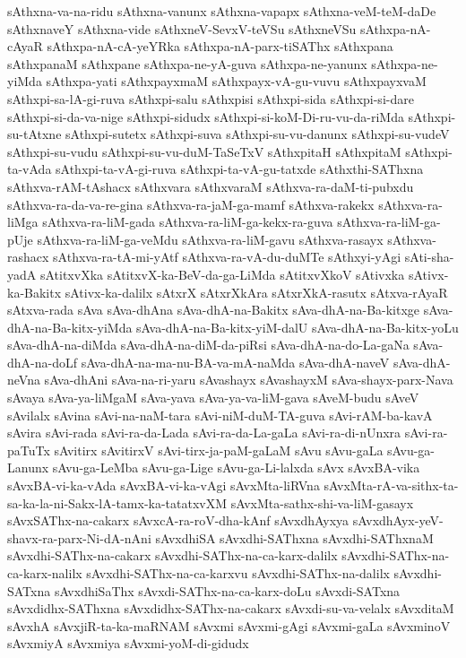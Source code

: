 {sAthxna-va-na-ridu
sAthxna-vanunx
sAthxna-vapapx
sAthxna-veM-teM-daDe
sAthxnaveY
sAthxna-vide
sAthxneV-SevxV-teVSu
sAthxneVSu
sAthxpa-nA-cAyaR
sAthxpa-nA-cA-yeYRka
sAthxpa-nA-parx-tiSAThx
sAthxpana
sAthxpanaM
sAthxpane
sAthxpa-ne-yA-guva
sAthxpa-ne-yanunx
sAthxpa-ne-yiMda
sAthxpa-yati
sAthxpayxmaM
sAthxpayx-vA-gu-vuvu
sAthxpayxvaM
sAthxpi-sa-lA-gi-ruva
sAthxpi-salu
sAthxpisi
sAthxpi-sida
sAthxpi-si-dare
sAthxpi-si-da-va-nige
sAthxpi-sidudx
sAthxpi-si-koM-Di-ru-vu-da-riMda
sAthxpi-su-tAtxne
sAthxpi-sutetx
sAthxpi-suva
sAthxpi-su-vu-danunx
sAthxpi-su-vudeV
sAthxpi-su-vudu
sAthxpi-su-vu-duM-TaSeTxV
sAthxpitaH
sAthxpitaM
sAthxpi-ta-vAda
sAthxpi-ta-vA-gi-ruva
sAthxpi-ta-vA-gu-tatxde
sAthxthi-SAThxna
sAthxva-rAM-tAshacx
sAthxvara
sAthxvaraM
sAthxva-ra-daM-ti-pubxdu
sAthxva-ra-da-va-re-gina
sAthxva-ra-jaM-ga-mamf
sAthxva-rakekx
sAthxva-ra-liMga
sAthxva-ra-liM-gada
sAthxva-ra-liM-ga-kekx-ra-guva
sAthxva-ra-liM-ga-pUje
sAthxva-ra-liM-ga-veMdu
sAthxva-ra-liM-gavu
sAthxva-rasayx
sAthxva-rashacx
sAthxva-ra-tA-mi-yAtf
sAthxva-ra-vA-du-duMTe
sAthxyi-yAgi
sAti-sha-yadA
sAtitxvXka
sAtitxvX-ka-BeV-da-ga-LiMda
sAtitxvXkoV
sAtivxka
sAtivx-ka-Bakitx
sAtivx-ka-dalilx
sAtxrX
sAtxrXkAra
sAtxrXkA-rasutx
sAtxva-rAyaR
sAtxva-rada
sAva
sAva-dhAna
sAva-dhA-na-Bakitx
sAva-dhA-na-Ba-kitxge
sAva-dhA-na-Ba-kitx-yiMda
sAva-dhA-na-Ba-kitx-yiM-dalU
sAva-dhA-na-Ba-kitx-yoLu
sAva-dhA-na-diMda
sAva-dhA-na-diM-da-piRsi
sAva-dhA-na-do-La-gaNa
sAva-dhA-na-doLf
sAva-dhA-na-ma-nu-BA-va-mA-naMda
sAva-dhA-naveV
sAva-dhA-neVna
sAva-dhAni
sAva-na-ri-yaru
sAvashayx
sAvashayxM
sAva-shayx-parx-Nava
sAvaya
sAva-ya-liMgaM
sAva-yava
sAva-ya-va-liM-gava
sAveM-budu
sAveV
sAvilalx
sAvina
sAvi-na-naM-tara
sAvi-niM-duM-TA-guva
sAvi-rAM-ba-kavA
sAvira
sAvi-rada
sAvi-ra-da-Lada
sAvi-ra-da-La-gaLa
sAvi-ra-di-nUnxra
sAvi-ra-paTuTx
sAvitirx
sAvitirxV
sAvi-tirx-ja-paM-gaLaM
sAvu
sAvu-gaLa
sAvu-ga-Lanunx
sAvu-ga-LeMba
sAvu-ga-Lige
sAvu-ga-Li-lalxda
sAvx
sAvxBA-vika
sAvxBA-vi-ka-vAda
sAvxBA-vi-ka-vAgi
sAvxMta-liRVna
sAvxMta-rA-va-sithx-ta-sa-ka-la-ni-Sakx-lA-tamx-ka-tatatxvXM
sAvxMta-sathx-shi-va-liM-gasayx
sAvxSAThx-na-cakarx
sAvxcA-ra-roV-dha-kAnf
sAvxdhAyxya
sAvxdhAyx-yeV-shavx-ra-parx-Ni-dA-nAni
sAvxdhiSA
sAvxdhi-SAThxna
sAvxdhi-SAThxnaM
sAvxdhi-SAThx-na-cakarx
sAvxdhi-SAThx-na-ca-karx-dalilx
sAvxdhi-SAThx-na-ca-karx-nalilx
sAvxdhi-SAThx-na-ca-karxvu
sAvxdhi-SAThx-na-dalilx
sAvxdhi-SATxna
sAvxdhiSaThx
sAvxdi-SAThx-na-ca-karx-doLu
sAvxdi-SATxna
sAvxdidhx-SAThxna
sAvxdidhx-SAThx-na-cakarx
sAvxdi-su-va-velalx
sAvxditaM
sAvxhA
sAvxjiR-ta-ka-maRNAM
sAvxmi
sAvxmi-gAgi
sAvxmi-gaLa
sAvxminoV
sAvxmiyA
sAvxmiya
sAvxmi-yoM-di-gidudx
}
